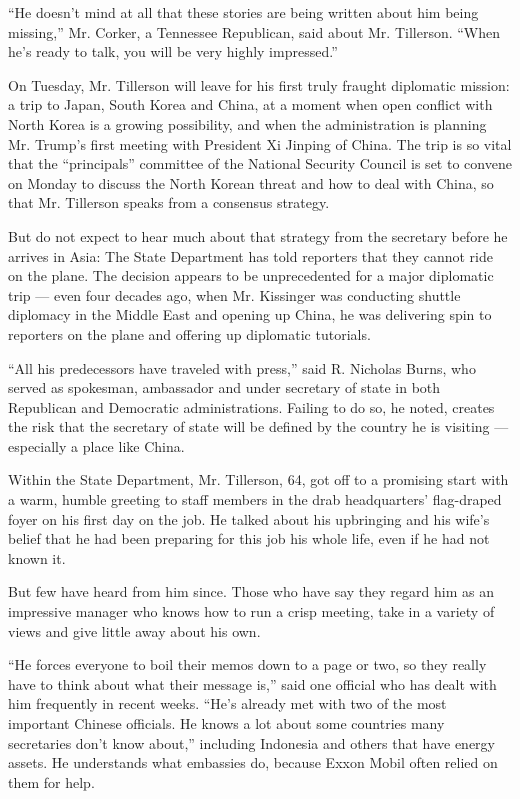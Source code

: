 ``He doesn't mind at all that these stories are being written about him
being missing,'' Mr. Corker, a Tennessee Republican, said about Mr.
Tillerson. ``When he's ready to talk, you will be very highly
impressed.''

On Tuesday, Mr. Tillerson will leave for his first truly fraught
diplomatic mission: a trip to Japan, South Korea and China, at a moment
when open conflict with North Korea is a growing possibility, and when
the administration is planning Mr. Trump's first meeting with President
Xi Jinping of China. The trip is so vital that the ``principals''
committee of the National Security Council is set to convene on Monday
to discuss the North Korean threat and how to deal with China, so that
Mr. Tillerson speaks from a consensus strategy.

But do not expect to hear much about that strategy from the secretary
before he arrives in Asia: The State Department has told reporters that
they cannot ride on the plane. The decision appears to be unprecedented
for a major diplomatic trip --- even four decades ago, when Mr.
Kissinger was conducting shuttle diplomacy in the Middle East and
opening up China, he was delivering spin to reporters on the plane and
offering up diplomatic tutorials.

``All his predecessors have traveled with press,'' said R. Nicholas
Burns, who served as spokesman, ambassador and under secretary of state
in both Republican and Democratic administrations. Failing to do so, he
noted, creates the risk that the secretary of state will be defined by
the country he is visiting --- especially a place like China.

Within the State Department, Mr. Tillerson, 64, got off to a promising
start with a warm, humble greeting to staff members in the drab
headquarters' flag-draped foyer on his first day on the job. He talked
about his upbringing and his wife's belief that he had been preparing
for this job his whole life, even if he had not known it.

But few have heard from him since. Those who have say they regard him as
an impressive manager who knows how to run a crisp meeting, take in a
variety of views and give little away about his own.

``He forces everyone to boil their memos down to a page or two, so they
really have to think about what their message is,'' said one official
who has dealt with him frequently in recent weeks. ``He's already met
with two of the most important Chinese officials. He knows a lot about
some countries many secretaries don't know about,'' including Indonesia
and others that have energy assets. He understands what embassies do,
because Exxon Mobil often relied on them for help.

